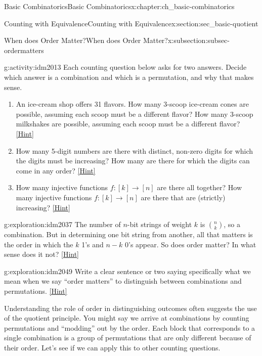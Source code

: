 \documentclass[oneside,10pt,]{book}
\numberwithin{equation}{chapter}
\begin{document}
\begin{chapterptx}{Basic Combinatorics}{}{Basic Combinatorics}{}{}{x:chapter:ch_basic-combinatorics}
\begin{sectionptx}{Counting with Equivalence}{}{Counting with Equivalence}{}{}{x:section:sec_basic-quotient}
\begin{subsectionptx}{When does Order Matter?}{}{When does Order Matter?}{}{}{x:subsection:subsec-ordermatters}
\begin{activity}{}{g:activity:idm2013}%
Each counting question below asks for two answers.  Decide which answer is a combination and which is a permutation, and why that makes sense.%
\begin{enumerate}[font=\bfseries,label=(\alph*),ref=\alph*]
\item{}An ice-cream shop offers 31 flavors.  How many 3-scoop ice-cream cones are possible, assuming each scoop must be a different flavor?  How many 3-scoop milkshakes are possible, assuming each scoop must be a different flavor?%
\space\hspace*{0pt}\hfill{\tiny\hyperlink{g:hint:idm2019-back}{[Hint]}}\item{}How many 5-digit numbers are there with distinct, non-zero digits for which the digits must be increasing?  How many are there for which the digits can come in any order?%
\space\hspace*{0pt}\hfill{\tiny\hyperlink{g:hint:idm2024-back}{[Hint]}}\item{}How many injective functions \(f:[k] \to [n]\) are there all   together?  How many injective functions \(f:[k] \to [n]\) are there that are (strictly) increasing?%
\space\hspace*{0pt}\hfill{\tiny\hyperlink{g:hint:idm2034-back}{[Hint]}}\end{enumerate}
\end{activity}
\begin{exploration}{}{g:exploration:idm2037}%
The number of \(n\)-bit strings of weight \(k\) is \(\binom{n}{k}\), so a combination.  But in determining one bit string from another, all that matters is the order in which the \(k\) 1's and \(n-k\) 0's appear.  So does order matter?  In what sense does it not?%
\space\hspace*{0pt}\hfill{\tiny\hyperlink{g:hint:idm2045-back}{[Hint]}}\end{exploration}
\begin{exploration}{}{g:exploration:idm2049}%
Write a clear sentence or two saying specifically what we mean when we say ``order matters'' to distinguish between combinations and permutations.%
\space\hspace*{0pt}\hfill{\tiny\hyperlink{g:hint:idm2053-back}{[Hint]}}\end{exploration}
Understanding the role of order in distinguishing outcomes often suggests the use of the quotient principle.  You might say we arrive at combinations by counting permutations and ``modding'' out by the order.  Each block that corresponds to a single combination is a group of permutations that are only different because of their order.  Let's see if we can apply this to other counting questions.%

\end{subsectionptx}
\end{sectionptx}
\end{chapterptx}
\end{document}
